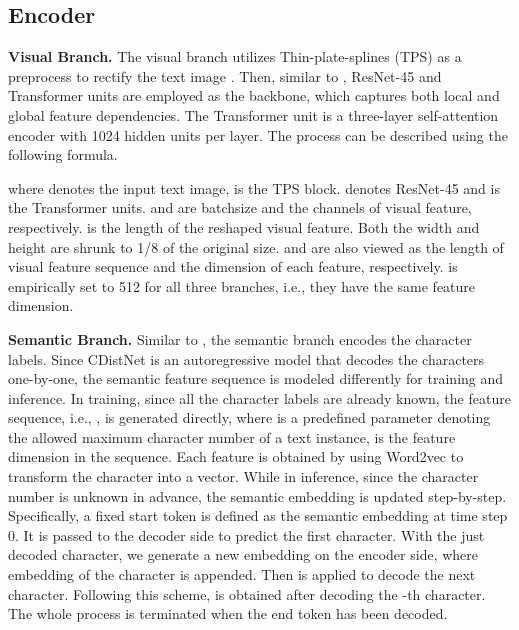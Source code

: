 \subsection{Encoder}

\noindent\textbf{Visual Branch.}
The visual branch utilizes Thin-plate-splines (TPS) as a preprocess to rectify the text image \citep{shi2018aster,Baekwhats_wrong_19ICCV}. Then, similar to \citep{ABInet21CVPR,SRNyu2020towards}, ResNet-45 and Transformer units are employed as the backbone, which captures both local and global feature dependencies. The Transformer unit is a three-layer self-attention encoder with 1024 hidden units per layer. The process can be described using the following formula.


where  denotes the input text image,  is the TPS block.  denotes ResNet-45 and  is the Transformer units.  and  are batchsize and the channels of visual feature, respectively.  is the length of the reshaped visual feature. Both the width and height are shrunk to 1/8 of the original size.  and  are also viewed as the length of visual feature sequence and the dimension of each feature, respectively.  is empirically set to 512 for all three branches, i.e., they have the same feature dimension.

\noindent\textbf{Semantic Branch.}
Similar to \citep{sheng2019nrtr,yue2020robustscanner}, the semantic branch encodes the character labels. Since CDistNet is an autoregressive model that decodes the characters one-by-one, the semantic feature sequence is modeled differently for training and inference. In training, since all the character labels are already known, the feature sequence, i.e., , is generated directly, where  is a predefined parameter denoting the allowed maximum character number of a text instance,  is the feature dimension in the sequence. Each feature is obtained by using Word2vec to transform the character into a vector. While in inference, since the character number is unknown in advance, the semantic embedding is updated step-by-step. Specifically, a fixed start token  is defined as the semantic embedding at time step 0. It is passed to the decoder side to predict the first character. With the just decoded character, we generate a new embedding  on the encoder side, where embedding of the character is appended. Then  is applied to decode the next character. Following this scheme,  is obtained after decoding the -th character. The whole process is terminated when the end token has been decoded.

